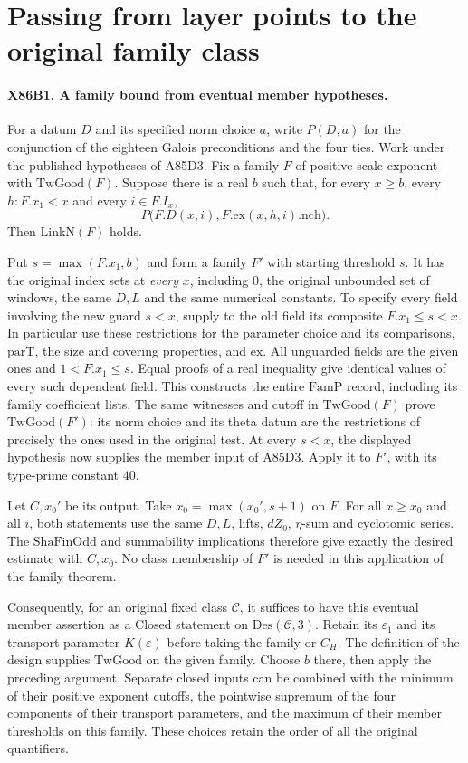 \section{Passing from layer points to the original family class}

\paragraph{X86B1. A family bound from eventual member hypotheses.}
For a datum $D$ and its specified norm choice $a$, write
$P(D,a)$ for the conjunction of the eighteen Galois preconditions
and the four ties. Work under the published hypotheses of A85D3.
Fix a family $F$ of positive scale exponent with $\mathrm{TwGood}(F)$.
Suppose there is a real $b$ such that, for every $x\ge b$, every
$h:F.x_1<x$ and every $i\in F.I_x$,
\[
               P\bigl(F.D(x,i),F.\mathrm{ex}(x,h,i).\mathrm{nch}\bigr).
\]
Then $\mathrm{LinkN}(F)$ holds.

Put $s=\max(F.x_1,b)$ and form a family $F'$ with starting
threshold $s$. It has the original index sets at \emph{every} $x$,
including $0$, the original unbounded set of windows, the same $D,L$
and the same numerical constants. To specify every field involving
the new guard $s<x$, supply to the old field its composite
$F.x_1\le s<x$. In particular use these restrictions for the parameter
choice and its comparisons, $\mathrm{parT}$, the size and covering
properties, and $\mathrm{ex}$. All unguarded fields are the given
ones and $1<F.x_1\le s$. Equal proofs of a real inequality give
identical values of every such dependent field. This constructs
the entire $\mathrm{FamP}$ record, including its family coefficient
lists. The same witnesses and cutoff in $\mathrm{TwGood}(F)$ prove
$\mathrm{TwGood}(F')$: its norm choice and its theta datum are
the restrictions of precisely the ones used in the original test.
At every $s<x$, the displayed hypothesis now supplies the member
input of A85D3. Apply it to $F'$, with its type-prime constant $40$.

Let $C,x_0'$ be its output. Take $x_0=\max(x_0',s+1)$ on $F$.
For all $x\ge x_0$ and all $i$, both statements use the same
$D,L$, lifts, $dZ_0$, $\eta$-sum and cyclotomic series.
The $\mathrm{ShaFinOdd}$ and summability implications therefore
give exactly the desired estimate with $C,x_0$. No class membership
of $F'$ is needed in this application of the family theorem.

Consequently, for an original fixed class $\mathcal C$, it suffices
to have this eventual member assertion as a $\mathrm{Closed}$
statement on $\mathrm{Des}(\mathcal C,3)$. Retain its
$\varepsilon_1$ and its transport parameter $K(\varepsilon)$
before taking the family or $C_H$. The definition of the design
supplies $\mathrm{TwGood}$ on the given family. Choose $b$ there,
then apply the preceding argument. Separate closed inputs can be
combined with the minimum of their positive exponent cutoffs,
the pointwise supremum of the four components of their transport
parameters, and the maximum of their member thresholds on this
family. These choices retain the order of all the original quantifiers.


